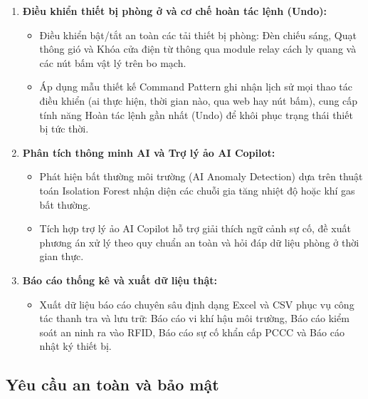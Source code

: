 \begin{enumerate}
\begin{itemize}
        \item Ứng dụng thuật toán sinh mã thẻ tự động dựa trên hàm băm SHA-256 kết hợp mã số sinh viên (MSSV) để cấp phát mã thẻ chuẩn định dạng \texttt{CARD\_XXXXXXXX}.
        \item Tự động đối soát UID thẻ với danh sách sinh viên nội trú của phòng: Nếu hợp lệ (\texttt{GRANTED}), kích hoạt mở khóa cửa Solenoid trong 4 giây và còi bíp xác nhận; nếu không hợp lệ (\texttt{DENIED}), giữ khóa cửa, phát 3 tiếng còi cảnh báo và ghi nhận vi phạm an ninh lên hệ thống.
    \end{itemize}
    \item \textbf{Điều khiển thiết bị phòng ở và cơ chế hoàn tác lệnh (Undo):}
    \begin{itemize}
        \item Điều khiển bật/tắt an toàn các tải thiết bị phòng: Đèn chiếu sáng, Quạt thông gió và Khóa cửa điện từ thông qua module relay cách ly quang và các nút bấm vật lý trên bo mạch.
        \item Áp dụng mẫu thiết kế Command Pattern ghi nhận lịch sử mọi thao tác điều khiển (ai thực hiện, thời gian nào, qua web hay nút bấm), cung cấp tính năng Hoàn tác lệnh gần nhất (Undo) để khôi phục trạng thái thiết bị tức thời.
    \end{itemize}
    \item \textbf{Phân tích thông minh AI và Trợ lý ảo AI Copilot:}
    \begin{itemize}
        \item Phát hiện bất thường môi trường (AI Anomaly Detection) dựa trên thuật toán Isolation Forest nhận diện các chuỗi gia tăng nhiệt độ hoặc khí gas bất thường.
        \item Tích hợp trợ lý ảo AI Copilot hỗ trợ giải thích ngữ cảnh sự cố, đề xuất phương án xử lý theo quy chuẩn an toàn và hỏi đáp dữ liệu phòng ở thời gian thực.
    \end{itemize}
    \item \textbf{Báo cáo thống kê và xuất dữ liệu thật:}
    \begin{itemize}
        \item Xuất dữ liệu báo cáo chuyên sâu định dạng Excel và CSV phục vụ công tác thanh tra và lưu trữ: Báo cáo vi khí hậu môi trường, Báo cáo kiểm soát an ninh ra vào RFID, Báo cáo sự cố khẩn cấp PCCC và Báo cáo nhật ký thiết bị.
    \end{itemize}
\end{enumerate}

\subsection{Yêu cầu an toàn và bảo mật}
\label{subsec:yeu_cau_bao_mat}

